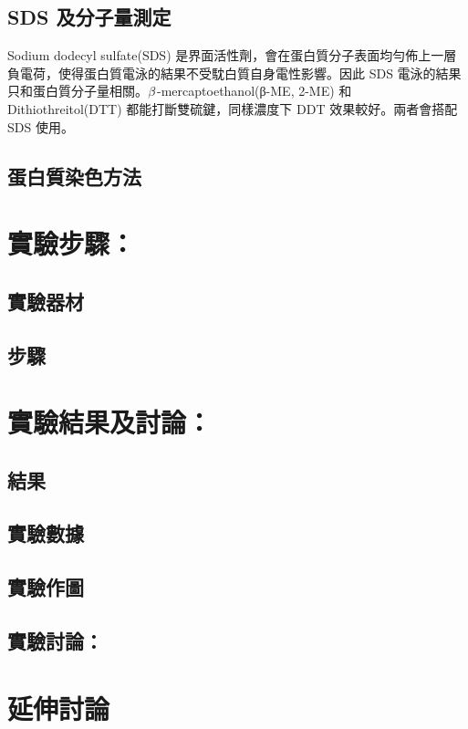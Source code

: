 \subsection{SDS 及分子量測定}
Sodium dodecyl sulfate(SDS) 是界面活性劑，會在蛋白質分子表面均勻佈上一層負電荷，使得蛋白質電泳的結果不受馾白質自身電性影響。因此 SDS 電泳的結果只和蛋白質分子量相關。$\ce{\beta}$-mercaptoethanol(β-ME, 2-ME) 和 Dithiothreitol(DTT) 都能打斷雙硫鍵，同樣濃度下 DDT 效果較好。兩者會搭配 SDS 使用。

\subsection{蛋白質染色方法}






\section*{實驗步驟：}

\subsection*{實驗器材}



\subsection*{步驟}





\section*{實驗結果及討論：}
\subsection*{結果}

  




\subsection*{實驗數據}


\subsection*{實驗作圖}



\newpage
\subsection*{實驗討論：}




\newpage
\section*{延伸討論}





 

